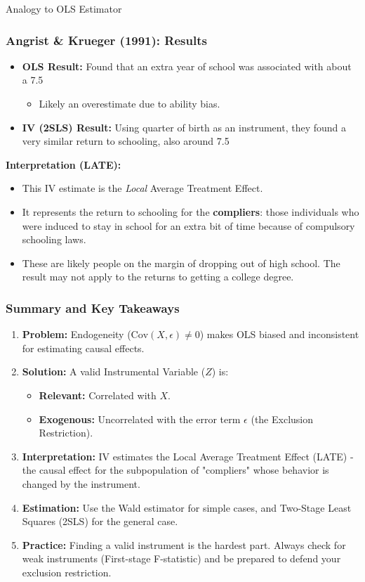 \documentclass[
  ignorenonframetext,
  aspectratio=169]{beamer}
\newcommand{\Cov}{\text{Cov}}
\begin{document}
\begin{frame}{Analogy to OLS Estimator}
\begin{frame}
\frametitle{Angrist \& Krueger (1991): Results}
\begin{itemize}
    \item \textbf{OLS Result:} Found that an extra year of school was associated with about a 7.5%
        \begin{itemize}
            \item Likely an overestimate due to ability bias.
        \end{itemize}
    \item \textbf{IV (2SLS) Result:} Using quarter of birth as an instrument, they found a very similar return to schooling, also around 7.5%
\end{itemize}
\pause
\textbf{Interpretation (LATE):}
\begin{itemize}
    \item This IV estimate is the \textit{Local} Average Treatment Effect.
    \item It represents the return to schooling for the \textbf{compliers}: those individuals who were induced to stay in school for an extra bit of time because of compulsory schooling laws.
    \item These are likely people on the margin of dropping out of high school. The result may not apply to the returns to getting a college degree.
\end{itemize}
\end{frame}

\begin{frame}
\frametitle{Summary and Key Takeaways}
\begin{enumerate}
    \item \textbf{Problem:} Endogeneity ($\Cov(X, \epsilon) \neq 0$) makes OLS biased and inconsistent for estimating causal effects.
    \pause
    \item \textbf{Solution:} A valid Instrumental Variable ($Z$) is:
    \begin{itemize}
        \item \textbf{Relevant:} Correlated with $X$.
        \item \textbf{Exogenous:} Uncorrelated with the error term $\epsilon$ (the Exclusion Restriction).
    \end{itemize}
    \pause
    \item \textbf{Interpretation:} IV estimates the Local Average Treatment Effect (LATE) - the causal effect for the subpopulation of "compliers" whose behavior is changed by the instrument.
    \pause
    \item \textbf{Estimation:} Use the Wald estimator for simple cases, and Two-Stage Least Squares (2SLS) for the general case.
    \pause
    \item \textbf{Practice:} Finding a valid instrument is the hardest part. Always check for weak instruments (First-stage F-statistic) and be prepared to defend your exclusion restriction.
\end{enumerate}
\end{frame}
\end{frame}
\end{document}
